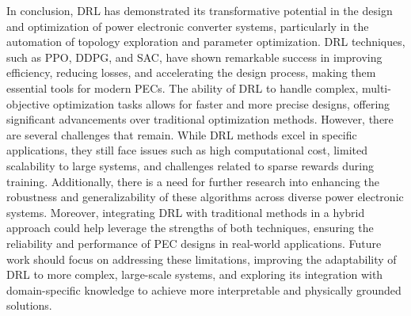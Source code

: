 In conclusion, DRL has demonstrated its transformative potential in the design and optimization of power electronic converter systems, particularly in the automation of topology exploration and parameter optimization. DRL techniques, such as PPO, DDPG, and SAC, have shown remarkable success in improving efficiency, reducing losses, and accelerating the design process, making them essential tools for modern PECs. The ability of DRL to handle complex, multi-objective optimization tasks allows for faster and more precise designs, offering significant advancements over traditional optimization methods. However, there are several challenges that remain. While DRL methods excel in specific applications, they still face issues such as high computational cost, limited scalability to large systems, and challenges related to sparse rewards during training. Additionally, there is a need for further research into enhancing the robustness and generalizability of these algorithms across diverse power electronic systems. Moreover, integrating DRL with traditional methods in a hybrid approach could help leverage the strengths of both techniques, ensuring the reliability and performance of PEC designs in real-world applications. Future work should focus on addressing these limitations, improving the adaptability of DRL to more complex, large-scale systems, and exploring its integration with domain-specific knowledge to achieve more interpretable and physically grounded solutions. 
